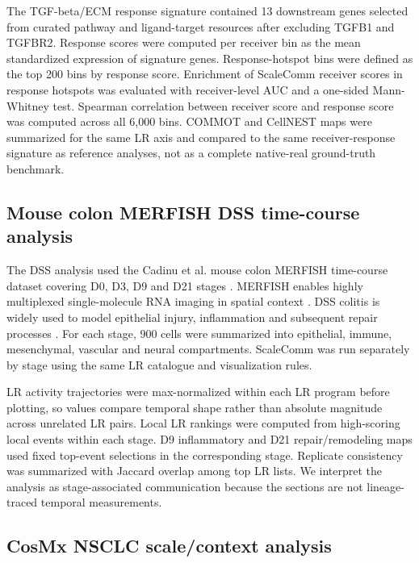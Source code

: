 \documentclass[referee,lineno,pdflatex,sn-vancouver-num]{sn-jnl}
\begin{document}
The TGF-beta/ECM response signature contained 13 downstream genes selected from curated pathway and ligand-target resources after excluding TGFB1 and TGFBR2. Response scores were computed per receiver bin as the mean standardized expression of signature genes. Response-hotspot bins were defined as the top 200 bins by response score. Enrichment of ScaleComm receiver scores in response hotspots was evaluated with receiver-level AUC and a one-sided Mann-Whitney test. Spearman correlation between receiver score and response score was computed across all 6,000 bins. COMMOT and CellNEST maps were summarized for the same LR axis and compared to the same receiver-response signature as reference analyses, not as a complete native-real ground-truth benchmark.

\subsection{Mouse colon MERFISH DSS time-course analysis}

The DSS analysis used the Cadinu et al. mouse colon MERFISH time-course dataset covering D0, D3, D9 and D21 stages \citep{cadinu2024colitis,moffitt2024dryad}. MERFISH enables highly multiplexed single-molecule RNA imaging in spatial context \citep{chen2015merfish,moffitt2018merfish}. DSS colitis is widely used to model epithelial injury, inflammation and subsequent repair processes \citep{wirtz2017dss,chassaing2014dss}. For each stage, 900 cells were summarized into epithelial, immune, mesenchymal, vascular and neural compartments. ScaleComm was run separately by stage using the same LR catalogue and visualization rules.

LR activity trajectories were max-normalized within each LR program before plotting, so values compare temporal shape rather than absolute magnitude across unrelated LR pairs. Local LR rankings were computed from high-scoring local events within each stage. D9 inflammatory and D21 repair/remodeling maps used fixed top-event selections in the corresponding stage. Replicate consistency was summarized with Jaccard overlap among top LR lists. We interpret the analysis as stage-associated communication because the sections are not lineage-traced temporal measurements.

\subsection{CosMx NSCLC scale/context analysis}
\end{document}
